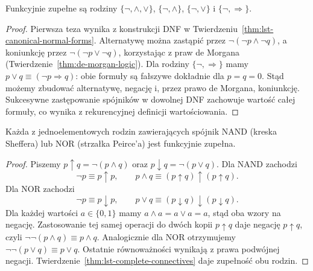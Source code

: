 \begin{twierdzenie}\label{thm:lst-complete-connectives}
Funkcyjnie zupełne są rodziny
$\{\neg,\land,\lor\}$, $\{\neg,\land\}$,
$\{\neg,\lor\}$ i $\{\neg,\Rightarrow\}$.
\end{twierdzenie}
\begin{proof}
Pierwsza teza wynika z konstrukcji DNF
w Twierdzeniu~\ref{thm:lst-canonical-normal-forms}.
Alternatywę można zastąpić przez
$\neg(\neg p\land\neg q)$, a koniunkcję przez
$\neg(\neg p\lor\neg q)$, korzystając z praw
de Morgana (Twierdzenie~\ref{thm:de-morgan-logic}).
Dla rodziny $\{\neg,\Rightarrow\}$ mamy
$p\lor q\equiv(\neg p\Rightarrow q)$:
obie formuły są fałszywe dokładnie dla $p=q=0$.
Stąd możemy zbudować alternatywę, negację i,
przez prawo de Morgana, koniunkcję.
Sukcesywne zastępowanie spójników w dowolnej DNF
zachowuje wartość całej formuły, co wynika
z rekurencyjnej definicji wartościowania.
\end{proof}

\begin{twierdzenie}
\label{thm:lst-nand-nor}
Każda z jednoelementowych rodzin zawierających
spójnik NAND (kreska Sheffera) lub NOR (strzałka Peirce'a)
jest funkcyjnie zupełna.
\end{twierdzenie}
\begin{proof}
Piszemy $p\uparrow q=\neg(p\land q)$ oraz
$p\downarrow q=\neg(p\lor q)$. Dla NAND zachodzi
\[
 \neg p\equiv p\uparrow p,\qquad
 p\land q\equiv(p\uparrow q)\uparrow(p\uparrow q).
\]
Dla NOR zachodzi
\[
 \neg p\equiv p\downarrow p,\qquad
 p\lor q\equiv(p\downarrow q)\downarrow(p\downarrow q).
\]
Dla każdej wartości $a\in\{0,1\}$ mamy
$a\land a=a\lor a=a$, stąd oba wzory na negację.
Zastosowanie tej samej operacji do dwóch kopii
$p\uparrow q$ daje negację $p\uparrow q$, czyli
$\neg\neg(p\land q)\equiv p\land q$.
Analogicznie dla NOR otrzymujemy
$\neg\neg(p\lor q)\equiv p\lor q$.
Ostatnie równoważności wynikają z prawa podwójnej negacji.
Twierdzenie~\ref{thm:lst-complete-connectives}
daje zupełność obu rodzin.
\end{proof}

